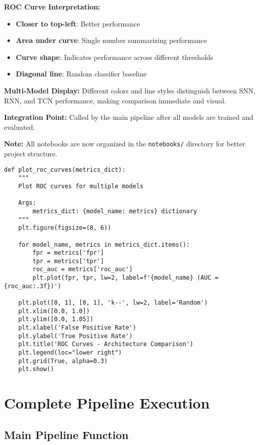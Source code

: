 \documentclass[12pt,a4paper]{article}
\begin{document}
\textbf{ROC Curve Interpretation:}
\begin{itemize}
    \item \textbf{Closer to top-left}: Better performance
    \item \textbf{Area under curve}: Single number summarizing performance
    \item \textbf{Curve shape}: Indicates performance across different thresholds
    \item \textbf{Diagonal line}: Random classifier baseline
\end{itemize}

\textbf{Multi-Model Display:} Different colors and line styles distinguish between SNN, RNN, and TCN performance, making comparison immediate and visual.

\textbf{Integration Point:} Called by the main pipeline after all models are trained and evaluated.

\textbf{Note:} All notebooks are now organized in the \texttt{notebooks/} directory for better project structure.

\begin{lstlisting}[caption={ROC Curve Comparison - Visual Performance Analysis}]
def plot_roc_curves(metrics_dict):
    """
    Plot ROC curves for multiple models
    
    Args:
        metrics_dict: {model_name: metrics} dictionary
    """
    plt.figure(figsize=(8, 6))
    
    for model_name, metrics in metrics_dict.items():
        fpr = metrics['fpr']
        tpr = metrics['tpr']
        roc_auc = metrics['roc_auc']
        plt.plot(fpr, tpr, lw=2, label=f'{model_name} (AUC = {roc_auc:.3f})')
    
    plt.plot([0, 1], [0, 1], 'k--', lw=2, label='Random')
    plt.xlim([0.0, 1.0])
    plt.ylim([0.0, 1.05])
    plt.xlabel('False Positive Rate')
    plt.ylabel('True Positive Rate')
    plt.title('ROC Curves - Architecture Comparison')
    plt.legend(loc="lower right")
    plt.grid(True, alpha=0.3)
    plt.show()
\end{lstlisting}

\section{Complete Pipeline Execution}

\subsection{Main Pipeline Function}
\end{document}
